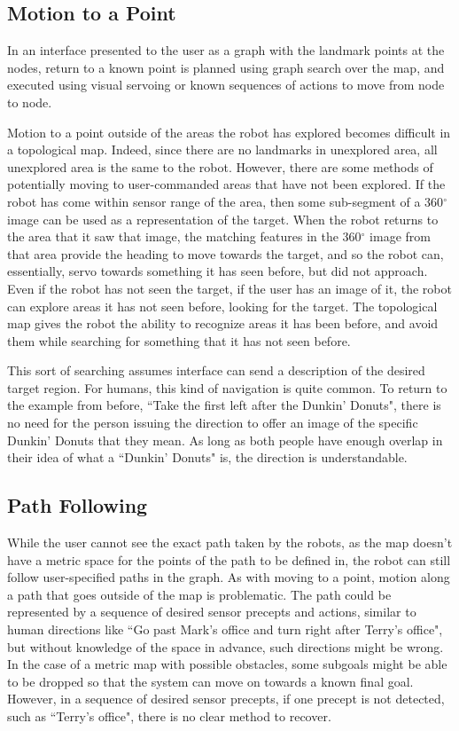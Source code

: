 \subsection{Motion to a Point}

In an interface presented to the user as a graph with the landmark points at the nodes, return to a known point is planned using graph search over the map, and executed using visual servoing or known sequences of actions to move from node to node. 

Motion to a point outside of the areas the robot has explored becomes difficult in a topological map. 
Indeed, since there are no landmarks in unexplored area, all unexplored area is the same to the robot. 
However, there are some methods of potentially moving to user-commanded areas that have not been explored. 
If the robot has come within sensor range of the area, then some sub-segment of a 360$^\circ$ image can be used as a representation of the target. 
When the robot returns to the area that it saw that image, the matching features in the 360$^\circ$ image from that area provide the heading to move towards the target, and so the robot can, essentially, servo towards something it has seen before, but did not approach. 
Even if the robot has not seen the target, if the user has an image of it, the robot can explore areas it has not seen before, looking for the target.
The topological map gives the robot the ability to recognize areas it has been before, and avoid them while searching for something that it has not seen before. 

This sort of searching assumes interface can send a description of the desired target region. 
For humans, this kind of navigation is quite common. 
To return to the example from before, ``Take the first left after the Dunkin' Donuts", there is no need for the person issuing the direction to offer an image of the specific Dunkin' Donuts that they mean. 
As long as both people have enough overlap in their idea of what a ``Dunkin' Donuts" is, the direction is understandable. 

\subsection{Path Following}

While the user cannot see the exact path taken by the robots, as the map doesn't have a metric space for the points of the path to be defined in, the robot can still follow user-specified paths in the graph.
As with moving to a point, motion along a path that goes outside of the map is problematic. 
The path could be represented by a sequence of desired sensor precepts and actions, similar to human directions like ``Go past Mark's office and turn right after Terry's office", but without knowledge of the space in advance, such directions might be wrong. 
In the case of a metric map with possible obstacles, some subgoals might be able to be dropped so that the system can move on towards a known final goal. 
However, in a sequence of desired sensor precepts, if one precept is not detected, such as ``Terry's office", there is no clear method to recover. 

